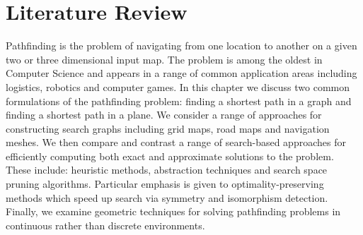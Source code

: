 \chapter{Literature Review}
\label{cha::lit::abstract}
Pathfinding is the problem of navigating from one location to another on a 
given two or three dimensional input map.
The problem is among the oldest in Computer Science and appears in a range
of common application areas including logistics, robotics and computer games.
In this chapter we discuss two common formulations of the pathfinding problem: 
finding a shortest path in a graph and finding a shortest path in a plane.
We consider a range of approaches for constructing search graphs including
grid maps, road maps and navigation meshes.
We then compare and contrast a range of search-based approaches for efficiently
computing both exact and approximate solutions to the problem. These include:
heuristic methods, abstraction techniques and search space pruning algorithms.
Particular emphasis is given to optimality-preserving methods which speed up
search via symmetry and isomorphism detection.  Finally, we examine geometric
techniques for solving pathfinding problems in continuous rather than discrete
environments. 

